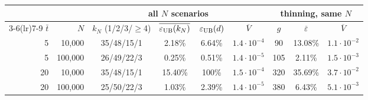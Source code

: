 \begin{tabular}{rrccccccc}
\toprule
 & & \multicolumn{4}{c}{all $N$ scenarios} & \multicolumn{3}{c}{thinning, same $N$} \\
\cmidrule(lr){3-6}\cmidrule(lr){7-9}
$\bar t$ & $N$ & $k_N$ (1/2/3/$\ge$4) & $\overline{\varepsilon_{\rm UB}(k_N)}$ & $\varepsilon_{\rm UB}(d)$ & $\overline{V}$ & $g$ & $\overline{\varepsilon}$ & $\overline{V}$ \\
\midrule
5 & 10{,}000 & 35/48/15/1 & 2.18\% & 6.64\% & $1.4\cdot10^{-4}$ & 90 & 13.08\% & $1.1\cdot10^{-2}$ \\
5 & 100{,}000 & 26/49/22/3 & 0.25\% & 0.51\% & $1.4\cdot10^{-5}$ & 105 & 2.11\% & $1.5\cdot10^{-3}$ \\
20 & 10{,}000 & 35/48/15/1 & 15.40\% & 100\% & $1.5\cdot10^{-4}$ & 320 & 35.69\% & $3.7\cdot10^{-2}$ \\
20 & 100{,}000 & 25/50/22/3 & 1.03\% & 2.39\% & $1.4\cdot10^{-5}$ & 380 & 6.43\% & $5.1\cdot10^{-3}$ \\
\bottomrule
\end{tabular}
